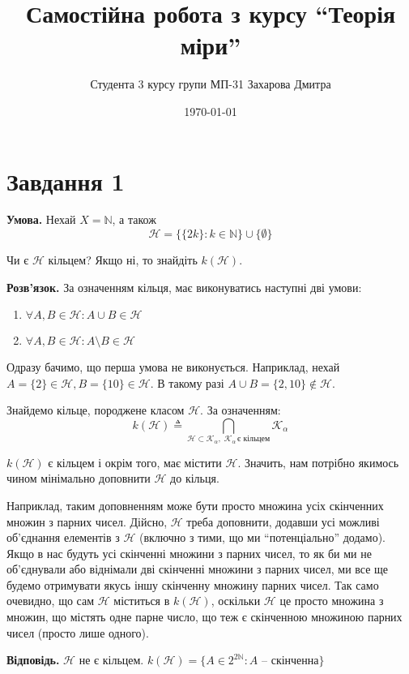 \documentclass[12pt]{extarticle}
\title{Самостійна робота з курсу ``Теорія міри''}
\author{Студента 3 курсу групи МП-31 Захарова Дмитра}
\date{\today}
\begin{document}
\maketitle

\section*{Завдання 1}

\textbf{Умова.} Нехай $X = \mathbb{N}$, а також
\[
\mathcal{H} = \{ \{2k\}: k \in \mathbb{N}\} \cup \{\emptyset\}
\]

Чи є $\mathcal{H}$ кільцем? Якщо ні, то знайдіть $k(\mathcal{H})$.

\textbf{Розв'язок.} За означенням кільця, має виконуватись наступні дві умови:
\begin{enumerate}
    \item $\forall A,B \in \mathcal{H}: A \cup B \in \mathcal{H}$
    \item $\forall A,B \in \mathcal{H}: A \setminus B \in \mathcal{H}$
\end{enumerate}

Одразу бачимо, що перша умова не виконується. Наприклад, нехай $A = \{2\} \in \mathcal{H}, B = \{10\} \in \mathcal{H}$. В такому разі $A \cup B = \{2,10\} \not\in \mathcal{H}$. 

Знайдемо кільце, породжене класом $\mathcal{H}$. За означенням:
\[
k(\mathcal{H}) \triangleq \bigcap_{\mathcal{H} \subset \mathcal{K}_{\alpha},\; \mathcal{K}_{\alpha} \, \text{є кільцем}} \mathcal{K}_{\alpha}
\]

$k(\mathcal{H})$ є кільцем і окрім того, має містити $\mathcal{H}$. Значить, нам потрібно якимось чином мінімально доповнити $\mathcal{H}$ до кільця. 

Наприклад, таким доповненням може бути просто множина усіх скінченних множин з парних чисел. Дійсно, $\mathcal{H}$ треба доповнити, додавши усі можливі об'єднання елементів з $\mathcal{H}$ (включно з тими, що ми ``потенціально'' додамо). Якщо в нас будуть усі скінченні множини з парних чисел, то як би ми не об'єднували або віднімали дві скінченні множини з парних чисел, ми все ще будемо отримувати якусь іншу скінченну множину парних чисел. Так само очевидно, що сам $\mathcal{H}$ міститься в $k(\mathcal{H})$, оскільки $\mathcal{H}$ це просто множина з множин, що містять одне парне число, що теж є скінченною множиною парних чисел (просто лише одного).

\textbf{Відповідь.} $\mathcal{H}$ не є кільцем. $k(\mathcal{H}) = \{A \in 2^{2\mathbb{N}}: A \text{ -- скінченна}\}$
\end{document}
